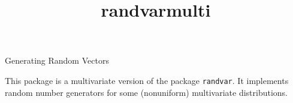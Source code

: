\documentclass [12pt]{article}
\begin{document}
\begin{titlepage}

\title{randvarmulti}{Generating Random Vectors}

This package is a multivariate version of the package \texttt{randvar}.
It implements random number generators for some
(nonuniform) multivariate distributions.


\vfill
\end{titlepage}



\tableofcontents
{}



%


%

%

%








\end{document}
